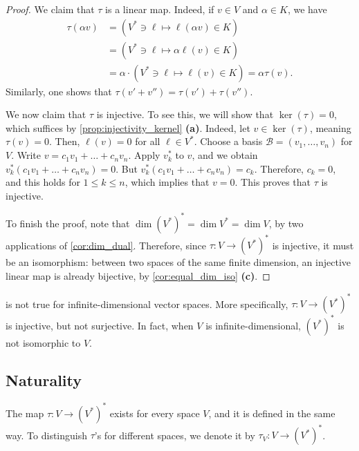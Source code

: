 \begin{proof}
  We claim that $\tau$ is a linear map. Indeed, if $v \in V$ and $\alpha \in K$, we have
  \begin{align*}
    \tau(\alpha v) &= (V^* \ni \ell \mapsto \ell(\alpha v) \in K) \\
    &= (V^* \ni \ell \mapsto \alpha \ell(v) \in K) \\
    &= \alpha \cdot (V^* \ni \ell \mapsto \ell(v) \in K) = \alpha \tau(v).
  \end{align*}
  Similarly, one shows that $\tau(v' + v'') = \tau(v') + \tau(v'')$.

  We now claim that $\tau$ is injective. To see this, we will show that $\ker(\tau) = 0$, which suffices by \cref{prop:injectivity_kernel} \textbf{(a)}. Indeed, let $v \in \ker(\tau)$, meaning $\tau(v) = 0$. Then, $\ell(v) = 0$ for all $\ell \in V^*$. Choose a basis $\mathcal{B} = (v_1, \dots, v_n)$ for $V$. Write $v = c_1 v_1 + \dots + c_n v_n$. Apply $v_k^*$ to $v$, and we obtain $v_k^*(c_1 v_1 + \dots + c_n v_n) = 0$. But $v_k^*(c_1 v_1 + \dots + c_n v_n) = c_k$. Therefore, $c_k = 0$, and this holds for $1 \leq k \leq n$, which implies that $v = 0$. This proves that $\tau$ is injective.

  To finish the proof, note that $\dim(V^*)^* = \dim V^* = \dim V$, by two applications of \cref{cor:dim_dual}. Therefore, since $\tau \colon V \to (V^*)^*$ is injective, it must be an isomorphism: between two spaces of the same finite dimension, an injective linear map is already bijective, by \cref{cor:equal_dim_iso} \textbf{(c)}.
\end{proof}

\begin{remark}
   is not true for infinite-dimensional vector spaces. More specifically, $\tau \colon V \to (V^*)^*$ is injective, but not surjective. In fact, when $V$ is infinite-dimensional, $(V^*)^*$ is not isomorphic to $V$.
\end{remark}

\subsection{Naturality}
The map $\tau \colon V \to (V^*)^*$ exists for every space $V$, and it is defined in the same way. To distinguish $\tau$'s for different spaces, we denote it by $\tau_V \colon V \to (V^*)^*$.

